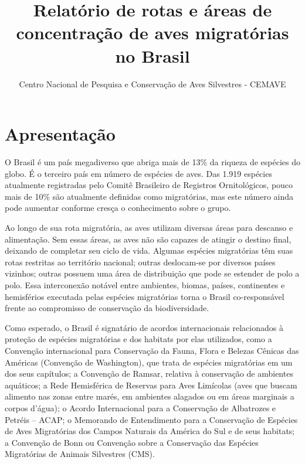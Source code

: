 \documentclass[
  oneside]{scrbook}
\title{Relatório de rotas e áreas de concentração de aves migratórias no Brasil}
\author{Centro Nacional de Pesquisa e Conservação de Aves Silvestres - CEMAVE}
\date{}
\begin{document}

\maketitle

{
\setcounter{tocdepth}{1}
\tableofcontents
}
\pagestyle{plain}

\hypertarget{apresentacao}{%
\chapter*{Apresentação}\label{apresentacao}}

O Brasil é um país megadiverso que abriga mais de 13\% da riqueza de espécies do globo. É o terceiro país em número de espécies de aves. Das 1.919 espécies atualmente registradas pelo Comitê Brasileiro de Registros Ornitológicos, pouco mais de 10\% são atualmente definidas como migratórias, mas este número ainda pode aumentar conforme cresça o conhecimento sobre o grupo.

Ao longo de sua rota migratória, as aves utilizam diversas áreas para descanso e alimentação. Sem essas áreas, as aves não são capazes de atingir o destino final, deixando de completar seu ciclo de vida. Algumas espécies migratórias têm suas rotas restritas ao território nacional; outras deslocam-se por diversos países vizinhos; outras possuem uma área de distribuição que pode se estender de polo a polo. Essa interconexão notável entre ambientes, biomas, países, continentes e hemisférios executada pelas espécies migratórias torna o Brasil co-responsável frente ao compromisso de conservação da biodiversidade.

Como esperado, o Brasil é signatário de acordos internacionais relacionados à proteção de espécies migratórias e dos habitats por elas utilizados, como a Convenção internacional para Conservação da Fauna, Flora e Belezas Cênicas das Américas (Convenção de Washington), que trata de espécies migratórias em um dos seus capítulos; a Convenção de Ramsar, relativa à conservação de ambientes aquáticos; a Rede Hemisférica de Reservas para Aves Limícolas (aves que buscam alimento nas zonas entre marés, em ambientes alagados ou em áreas marginais a corpos d'água); o Acordo Internacional para a Conservação de Albatrozes e Petréis -- ACAP; o Memorando de Entendimento para a Conservação de Espécies de Aves Migratórias dos Campos Naturais da América do Sul e de seus habitats; a Convenção de Bonn ou Convenção sobre a Conservação das Espécies Migratórias de Animais Silvestres (CMS).
\end{document}
